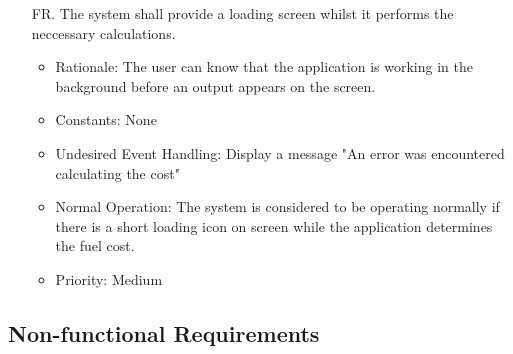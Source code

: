 \documentclass[12pt]{article}
\newcounter{reqnum} %
\begin{document}
\begin{itemize}
\item[FR\refstepcounter{reqnum}\thereqnum. ] The system shall provide a loading screen whilst it performs the neccessary calculations.
\begin{itemize}
    \item Rationale: The user can know that the application is working in the background before an output appears on the screen.
    \item Constants: None
    \item Undesired Event Handling: Display a message "An error was encountered calculating the cost"
    \item Normal Operation: The system is considered to be operating normally if there is a short loading icon on screen while the application determines the fuel cost.
	\item Priority: Medium
\end{itemize}

\end{itemize}

\subsection{Non-functional Requirements}
\end{document}
